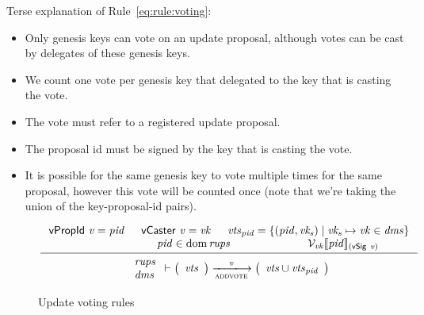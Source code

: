 Terse explanation of Rule~\ref{eq:rule:voting}:
\begin{itemize}
\item Only genesis keys can vote on an update proposal, although votes can be
  cast by delegates of these genesis keys.
\item We count one vote per genesis key that delegated to the key that is
  casting the vote.
\item The vote must refer to a registered update proposal.
\item The proposal id must be signed by the key that is casting the vote.
\item It is possible for the same genesis key to vote multiple times for
  the same proposal, however this vote will be counted once (note that we're
  taking the union of the key-proposal-id pairs).
\end{itemize}

\begin{figure}[htb]
  \begin{equation}
    \label{eq:rule:voting}
    \inference
    {
      \vPropId{v} = \var{pid} &  \vCaster{v} = \var{vk} &
      \var{vts}_{\var{pid}} =
      \{ (\var{pid}, \var{vk_s}) \mid \var{vk_s} \mapsto \var{vk} \in \var{dms} \}\\
      & \var{pid} \in \dom \var{rups} &
      \mathcal{V}_{\var{vk}}\serialised{\var{pid}}_{(\vSig{v})}\\
    }
    {
      {
        \begin{array}{l}
          \var{rups}\\
          \var{dms}
        \end{array}
      }
      \vdash
      {
        \left(
          \begin{array}{l}
            \var{vts}
          \end{array}
        \right)
      }
      \trans{addvote}{\var{v}}
      {
        \left(
          \begin{array}{l}
            \var{vts} \cup \var{vts}_{\var{pid}}\\
          \end{array}
        \right)
      }
    }
  \end{equation}
  \caption{Update voting rules}
  \label{fig:rules:voting}
\end{figure}

\clearpage

